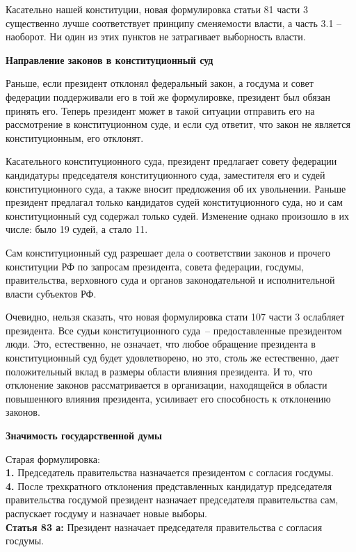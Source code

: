 \documentclass[a4paper, 12pt]{article}
\begin{document}
Касательно нашей конституции, новая формулировка статьи 81 части 3 существенно лучше соответствует принципу сменяемости власти, а часть 3.1 -- наоборот. 
Ни один из этих пунктов не затрагивает выборность власти. 





\newpage
\begin{center}\bf
Направление законов в конституционный суд
\end{center}

Раньше, если президент отклонял федеральный закон, а госдума и совет федерации поддерживали его в той же формулировке, президент был обязан принять его. 
Теперь президент может в такой ситуации отправить его на рассмотрение в конституционном суде, и если суд ответит, что закон не является конституционным, его отклонят. 

Касательного конституционного суда, президент предлагает совету федерации кандидатуры председателя конституционного суда, заместителя его и судей конституционного суда, а также вносит предложения об их увольнении. Раньше президент предлагал только кандидатов судей конституционного суда, но и сам конституционный суд содержал только судей. Изменение однако произошло в их числе: было 19 судей, а стало 11. 

Сам конституционный суд разрешает дела о соответствии законов и прочего конституции РФ по запросам президента, совета федерации, госдумы, правительства, верховного суда и органов законодательной и исполнительной власти субъектов РФ. 

Очевидно, нельзя сказать, что новая формулировка стати 107 части 3 ослабляет президента.
Все судьи конституционного суда~-- предоставленные президентом люди. 
Это, естественно, не означает, что любое обращение президента в конституционный суд будет удовлетворено, но это, столь же естественно, дает положительный вклад в размеры области влияния президента. 
И то, что отклонение законов рассматривается в организации, находящейся в области повышенного влияния президента, усиливает его способность к отклонению законов. 






\newpage
\begin{center}\bf
Значимость государственной думы
\end{center}

Старая формулировка: \\
\textbf{1.} Председатель правительства назначается президентом с согласия госдумы. \\
\textbf{4.} После трехкратного отклонения представленных кандидатур председателя правительства госдумой президент назначает председателя правительства сам, распускает госдуму и назначает новые выборы. \\
\textbf{Статья 83 а:} Президент назначает председателя правительства с согласия госдумы. 
\end{document}
